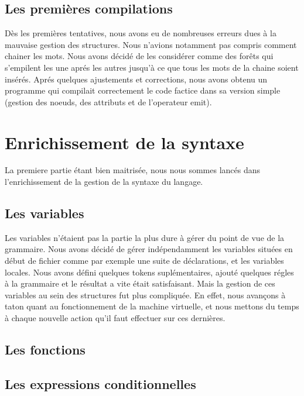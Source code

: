\documentclass[12pt]{article}
\begin{document}
\subsection{Les premières compilations}

Dès les premières tentatives, nous avons eu de nombreuses erreurs dues à la mauvaise
gestion des structures. Nous n'avions notamment pas compris comment chainer
les mots. Nous avons décidé de les considérer comme des forêts qui s'empilent les
une aprés les autres jusqu'à ce que tous les mots de la chaine soient insérés.
Aprés quelques ajustements et corrections, nous avons obtenu un programme qui
compilait correctement le code factice dans sa version simple (gestion des noeuds,
des attributs et de l'operateur emit).

\newpage


\section{Enrichissement de la syntaxe}

La premiere partie étant bien maitrisée, nous nous sommes lancés dans l'enrichissement
de la gestion de la syntaxe du langage.

\subsection{Les variables}

Les variables n'étaient pas la partie la plus dure à gérer du point de vue de
la grammaire. Nous avons décidé de gérer indépendamment les variables situées
en début de fichier comme par exemple une suite de déclarations, et les variables locales.
Nous avons défini quelques tokens suplémentaires, ajouté quelques régles à la
grammaire et le résultat a vite était satisfaisant.
\newline
Mais la gestion de ces variables au sein des structures fut plus compliquée.
En effet, nous avançons à taton quant au fonctionnement de la machine virtuelle, et
nous mettons du temps à chaque nouvelle action qu'il faut effectuer sur ces
dernières.

\subsection{Les fonctions}


\subsection{Les expressions conditionnelles}
\end{document}
